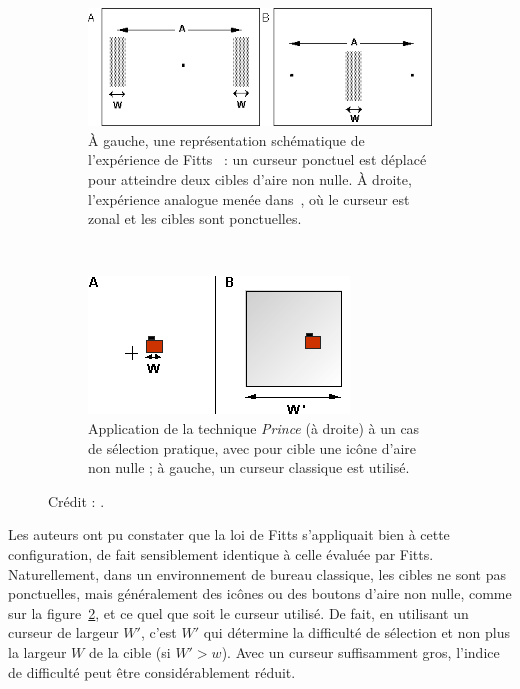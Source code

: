 	\begin{figure}[!htb]
		\begin{subfigure}[t]{0.56\textwidth}
			\centering
			\includegraphics[width=\textwidth]{figures/ch2/princeCursor}
			\caption{À gauche, une représentation schématique de l'expérience de Fitts~\cite{fitts1954information} : un curseur ponctuel est déplacé pour atteindre deux cibles d'aire non nulle. À droite, l'expérience analogue menée dans~\cite{kabbash1995prince}, où le curseur est zonal et les cibles sont ponctuelles.}
			\label{fig:princeCursor}
		\end{subfigure}
		~
		\begin{subfigure}[t]{0.42\textwidth}
			\centering
			\includegraphics[width=\textwidth]{figures/ch2/princeSelection}
			\caption{Application de la technique \emph{Prince} (à droite) à un cas de sélection pratique, avec pour cible une icône d'aire non nulle ; à gauche, un curseur classique est utilisé.}
			\label{fig:princeSelection}
		\end{subfigure}
		\caption[\emph{Prince}, curseur et sélection]{Crédit : \cite{kabbash1995prince}.}
		\label{fig:princeCursorSelection}
	\end{figure}

	Les auteurs ont pu constater que la loi de Fitts s'appliquait bien à cette configuration, de fait sensiblement identique à celle évaluée par Fitts. Naturellement, dans un environnement de bureau classique, les cibles ne sont pas ponctuelles, mais généralement des icônes ou des boutons d'aire non nulle, comme sur la figure~\ref{fig:princeSelection}, et ce quel que soit le curseur utilisé. De fait, en utilisant un curseur de largeur $W'$, c'est $W'$ qui détermine la difficulté de sélection et non plus la largeur $W$ de la cible (si $W' > w$). Avec un curseur suffisamment gros, l'indice de difficulté peut être considérablement réduit.
	
